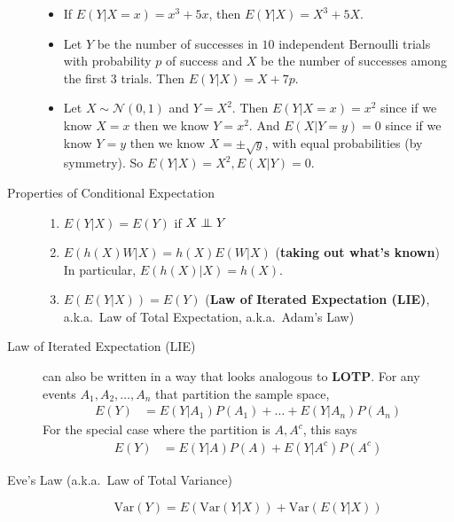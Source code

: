 \documentclass[10pt,landscape]{article}
\newcommand\independent{\protect\mathpalette{\protect\independenT}{\perp}}
\def\independenT#1#2{\mathrel{\setbox0\hbox{$#1#2$}%
    \copy0\kern-\wd0\mkern4mu\box0}}
\newcommand{\var}{\textrm{Var}}
\newcommand{\N}{\mathcal{N}}
\begin{document}
\begin{multicols*}{3}
\begin{description}
	\begin{itemize}
		\itemsep -.5mm
		\item If $E(Y|X=x) = x^3+5x$, then $E(Y|X) = X^3 + 5X$.
		\item Let $Y$ be the number of successes in $10$ independent Bernoulli trials with probability $p$ of success and $X$ be the number of successes among the first $3$ trials. Then $E(Y|X)=X+7p$.
		\item Let $X \sim \N(0,1)$ and $Y=X^2$. Then $E(Y|X=x) = x^2$ since if we know $X=x$ then we know $Y=x^2$. And $E(X|Y=y) = 0$ since if we know $Y=y$ then we know $X = \pm \sqrt{y}$, with equal probabilities (by symmetry). So $E(Y|X)=X^2, E(X|Y)=0$.  
	\end{itemize} 
	
	\item[Properties of Conditional Expectation] \quad
	\begin{enumerate}
		\item $E(Y|X) = E(Y)$ if $X \independent Y$
		\item $E(h(X)W|X) = h(X)E(W|X)$ (\textbf{taking out what's known}) \\
		In particular, $E(h(X)|X) = h(X)$.
		\item $E(E(Y|X)) = E(Y)$ (\textbf{Law of Iterated Expectation (LIE)}, a.k.a.~Law of Total Expectation, a.k.a.~Adam's Law)
	\end{enumerate}
	
	\item[Law of Iterated Expectation (LIE)]  can also be written in a way that looks analogous to \textbf{LOTP}. For any events $A_1, A_2, \dots, A_n$ that partition the sample space, 
	\begin{align*}
	E(Y) &= E(Y|A_1)P(A_1) + \dots + E(Y|A_n)P(A_n)
	\end{align*}
	For the special case where the partition is $A, A^c$, this says
	\begin{align*}
	E(Y) &= E(Y|A)P(A) + E(Y|A^c)P(A^c)
	\end{align*}
	
	\item[Eve's Law (a.k.a.~Law of Total Variance)] \quad
	\[\var(Y) = E(\var(Y|X)) + \var(E(Y|X))\]
\end{description}



\end{multicols*}
\end{document}
